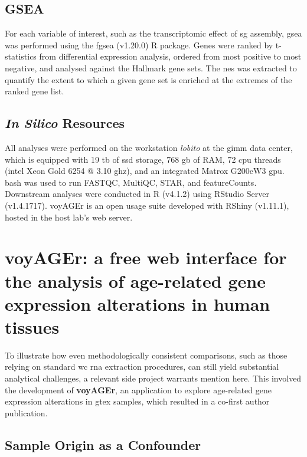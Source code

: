 \subsection{GSEA}

For each variable of interest, such as the transcriptomic effect of \gls{sg} assembly, \gls{gsea}\cite{subramanian_gene_2005} was performed using the fgsea (v1.20.0)\cite{korotkevich_fast_2016} R package. Genes were ranked by t-statistics from differential expression analysis, ordered from most positive to most negative, and analysed against the Hallmark gene sets\cite{liberzon_molecular_2015}. The \gls{nes} was extracted to quantify the extent to which a given gene set is enriched at the extremes of the ranked gene list.

\subsection{\textit{In Silico} Resources}

All analyses were performed on the workstation \textit{lobito} at the \gls{gimm} data center, which is equipped with 19 \gls{tb} of \gls{ssd} storage, 768 \gls{gb} of RAM, 72 \gls{cpu} threads (\gls{intel} Xeon
Gold 6254 @ 3.10 \gls{ghz}), and an integrated Matrox G200eW3 \gls{gpu}. \gls{bash} was used to run FASTQC\cite{andrews_fastqc_2010}, MultiQC\cite{ewels_multiqc_2016}, STAR\cite{dobin_star_2013}, and featureCounts\cite{liao_featurecounts_2014}. Downstream analyses were conducted in R (v4.1.2) using RStudio Server (v1.4.1717). voyAGEr is an open usage suite developed with RShiny (v1.11.1), hosted in the host lab's web server.


\section{voyAGEr: a free web interface for the analysis of age-related gene expression alterations in human tissues}

To illustrate how even methodologically consistent comparisons, such as those relying on standard \gls{wc} \gls{rna} extraction procedures, can still yield substantial analytical challenges, a relevant side project warrants mention here. This involved the development of \textbf{voyAGEr}, an application to explore age-related gene expression alterations in \gls{gtex}\cite{lonsdale_genotype-tissue_2013} samples, which resulted in a co-first author publication\cite{schneider_voyager_2024}.

\subsection{Sample Origin as a Confounder}

